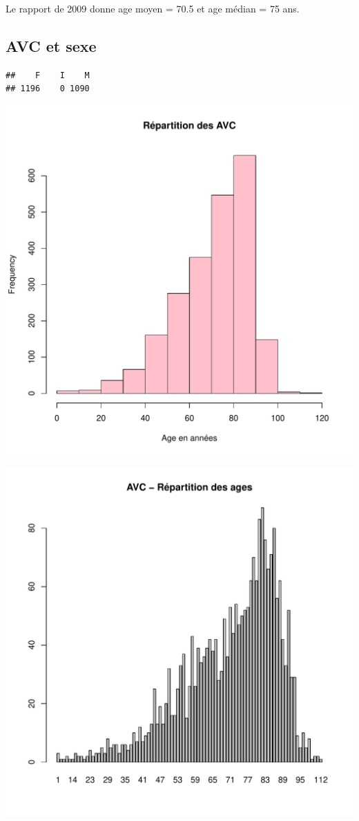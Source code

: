 \documentclass[12pt,english,french,twoside]{report}\usepackage[]{graphicx}\usepackage[]{color}
\makeatletter
\def\maxwidth{ %
  \ifdim\Gin@nat@width>\linewidth
    \linewidth
  \else
    \Gin@nat@width
  \fi
}
\newenvironment{kframe}{%
 \def\at@end@of@kframe{}%
 \ifinner\ifhmode%
  \def\at@end@of@kframe{\end{minipage}}%
  \begin{minipage}{\columnwidth}%
 \fi\fi%
 \def\FrameCommand##1{\hskip\@totalleftmargin \hskip-\fboxsep
 \colorbox{shadecolor}{##1}\hskip-\fboxsep
     \hskip-\linewidth \hskip-\@totalleftmargin \hskip\columnwidth}%
 \MakeFramed {\advance\hsize-\width
   \@totalleftmargin\z@ \linewidth\hsize
   \@setminipage}}%
 {\par\unskip\endMakeFramed%
 \at@end@of@kframe}
\newenvironment{knitrout}{}{} %
\makeatother
\begin{document}
Le rapport de 2009 donne age moyen = 70.5 et age médian = 75 ans.

\subsection*{AVC et sexe}
\begin{knitrout}
\color{fgcolor}\begin{kframe}
\begin{verbatim}
##    F    I    M 
## 1196    0 1090
\end{verbatim}
\end{kframe}
\includegraphics[width=\maxwidth]{figure/avc_sexe1} 

\includegraphics[width=\maxwidth]{figure/avc_sexe2} 


\end{knitrout}
\end{document}
